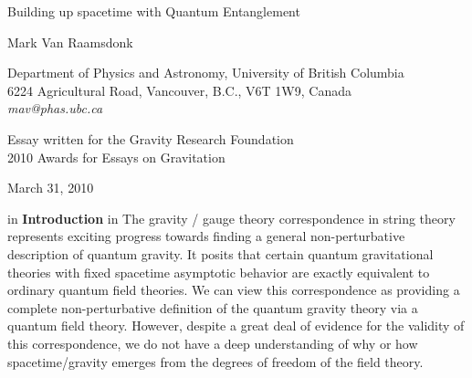 \documentclass[12pt,epsf]{article}
\renewcommand{\(}{\left(}
\renewcommand{\)}{\right)}
\begin{document}
\begin{titlepage}
\hfill

\vspace*{20mm}
\begin{center}
{\Large  Building up spacetime with Quantum Entanglement}

\vspace*{15mm}
\vspace*{1mm}

Mark Van Raamsdonk

\vspace*{1cm}

{Department of Physics and Astronomy,
University of British Columbia\\
6224 Agricultural Road,
Vancouver, B.C., V6T 1W9, Canada\\
{\it mav@phas.ubc.ca}
}

\vspace*{1cm}
\end{center}

\begin{abstract}
In this essay, we argue that the emergence of classically connected spacetimes is intimately related to the quantum entanglement of degrees of freedom in a non-perturbative description of quantum gravity. Disentangling the degrees of freedom associated with two regions of spacetime results in these regions pulling apart and pinching off from each other in a way that can be quantified by standard measures of entanglement.

\end{abstract}
\vskip 2cm

\begin{center}
Essay written for the Gravity Research Foundation \\ 2010 Awards for Essays on Gravitation
\vskip 1cm

March 31, 2010
\end{center}
\end{titlepage}

\vskip 1cm
 in
\noindent
{\bf Introduction}
 in
\noindent
The gravity / gauge theory correspondence \cite{bfss, malda,agmoo} in string theory represents exciting progress towards finding a general non-perturbative description of quantum gravity. It posits that certain quantum gravitational theories with fixed spacetime asymptotic behavior are exactly equivalent to ordinary quantum field theories. We can view this correspondence as providing a complete non-perturbative definition of the quantum gravity theory via a quantum field theory. However, despite a great deal of evidence for the validity of this correspondence, we do not have a deep understanding of why or how spacetime/gravity emerges from the degrees of freedom of the field theory.
\end{document}
